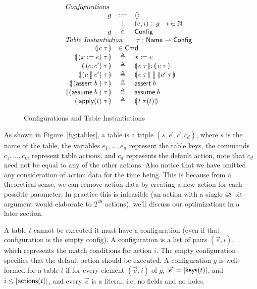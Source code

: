\begin{figure}[ht]
  \[\begin{array}{r c l}
      \multicolumn{3}{l}{\textit{Configurations}} \\
      g & ::= & \langle\rangle \\
        & \mid & (e,i)::g \quad i \in \mathbb N \\
      g & \in & \mathsf{Config}\\
      \multicolumn 3 l {\textit{Table Instantiation} \qquad \tau : \Name \rightharpoonup \mathsf{Config}}\\
      \parenbb{c\; \tau} &\multicolumn 2 l {\in \mathsf{Cmd}} \\
      \parenbb{(x:= e)\; \tau} &\triangleq& x := e \\
      \parenbb{(c;c')\; \tau} &\triangleq& \parenbb{c\; \tau};\parenbb{c\; \tau} \\
      \parenbb{(c\angel c')\; \tau} &\triangleq& \parenbb{c\; \tau} \angel \parenbb{c'\; \tau}\\
      \parenbb{(\assert b)\; \tau} &\triangleq& \assert b \\
      \parenbb{(\assume b)\; \tau} &\triangleq& \assume b \\
      \parenbb{\apply t\; \tau} &\triangleq& \parenbb{t\; \tau(t)}
    \end{array}\]

  \caption{Configurations and Table Instantiations}
  \label{fig:configs}

  
  
\end{figure}



As shown in Figure~\ref{fig:tables}, a table is a triple
$(s, \vec e, \vec c, c_d)$, where $s$ is the name of the table, the variables
$e_1,\ldots,e_n$ represent the table keys, the commands $c_1,\ldots, c_m$
represent table actions, and $c_d$ represents the default action, note that
$c_d$ need not be equal to any of the other actions. Also notice that we have
omitted any consideration of action data for the time being. This is because
from a theoretical sense, we can remove action data by creating a new action for
each possible parameter. In practice this is infeasible (an action with a single
48 bit argument would elaborate to $2^{48}$ actions), we'll discuss our
optimizations in a later section.

A table $t$ cannot be executed it must have a configuration (even if that
configuration is the empty config). A configuration is a list of pairs
$(\vec e,i)$, which represents the match conditions for action $i$. The empty
configuration specifies that the default action should be executed. A
configuration $g$ is well-formed for a table $t$ if for every element
$(\vec e, i)$ of $g$, $|\vec e| = |\mathsf{keys}(t)|$, and $i \leq |\mathsf{actions}(t)|$, and
every $\vec e$ is a literal, i.e. no fields and no holes.

